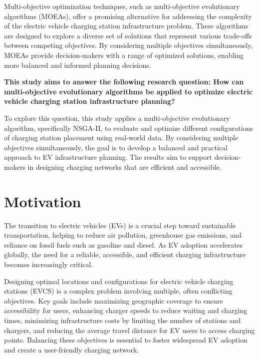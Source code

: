 Multi-objective optimization techniques, such as multi-objective evolutionary algorithms (MOEAs), offer a promising alternative for addressing the complexity of the electric vehicle charging station infrastructure problem. These algorithms are designed to explore a diverse set of solutions that represent various trade-offs between competing objectives. By considering multiple objectives simultaneously, MOEAs provide decision-makers with a range of optimized solutions, enabling more balanced and informed planning decisions.

\vspace{0.5em}

\textbf{This study aims to answer the following research question: How can multi-objective evolutionary algorithms be applied to optimize electric vehicle charging station infrastructure planning?}

\vspace{0.5em}

To explore this question, this study applies a multi-objective evolutionary algorithm, specifically NSGA-II, to evaluate and optimize different configurations of charging station placement using real-world data. By considering multiple objectives simultaneously, the goal is to develop a balanced and practical approach to EV infrastructure planning. The results aim to support decision-makers in designing charging networks that are efficient and accessible.

\section{Motivation}

The transition to electric vehicles (EVs) is a crucial step toward sustainable transportation, helping to reduce air pollution, greenhouse gas emissions, and reliance on fossil fuels such as gasoline and diesel. As EV adoption accelerates globally, the need for a reliable, accessible, and efficient charging infrastructure becomes increasingly critical.

Designing optimal locations and configurations for electric vehicle charging stations (EVCS) is a complex problem involving multiple, often conflicting objectives. Key goals include maximizing geographic coverage to ensure accessibility for users, enhancing charger speeds to reduce waiting and charging times, minimizing infrastructure costs by limiting the number of stations and chargers, and reducing the average travel distance for EV users to access charging points. Balancing these objectives is essential to foster widespread EV adoption and create a user-friendly charging network.


